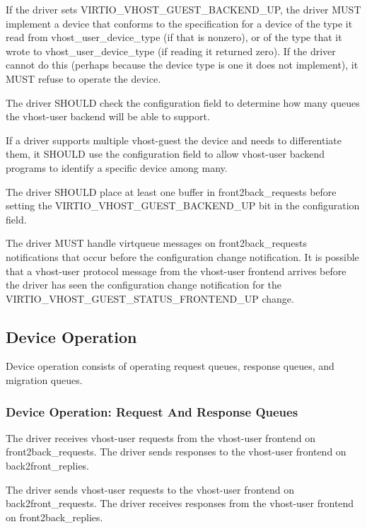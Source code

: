 If the driver sets VIRTIO_VHOST_GUEST_BACKEND_UP, the driver MUST
implement a device that conforms to the specification for a
device of the type it read from vhost_user_device_type (if that
is nonzero), or of the type that it wrote to
vhost_user_device_type (if reading it returned zero). If the
driver cannot do this (perhaps because the device type is one it
does not implement), it MUST refuse to operate the device.

The driver SHOULD check the 
configuration field to determine how many queues the
vhost-user backend will be able to support.

If a driver supports multiple vhost-guest the device and needs
to differentiate them, it SHOULD use the 
configuration field to allow vhost-user backend programs to
identify a specific device among many.

The driver SHOULD place at least one buffer in
front2back_requests before setting the
VIRTIO_VHOST_GUEST_BACKEND_UP bit in the 
configuration field.

The driver MUST handle virtqueue messages on front2back_requests
notifications that occur before the configuration change
notification. It is possible that a vhost-user protocol
message from the vhost-user frontend arrives before the
driver has seen the configuration change notification for the
VIRTIO_VHOST_GUEST_STATUS_FRONTEND_UP  change.

\subsection{Device Operation}\label{sec:Device Types / Vhost-Guest Device / Device Operation}

Device operation consists of operating request queues, response
queues, and migration queues.

\subsubsection{Device Operation: Request And Response Queues}\label{sec:Device Types / Vhost-Guest Device / Device Operation / Device Operation: Request And Response Queues}

The driver receives vhost-user requests from the vhost-user
frontend on front2back_requests. The driver sends responses
to the vhost-user frontend on back2front_replies.

The driver sends vhost-user requests to the vhost-user frontend
on back2front_requests. The driver receives responses from
the vhost-user frontend on front2back_replies.


